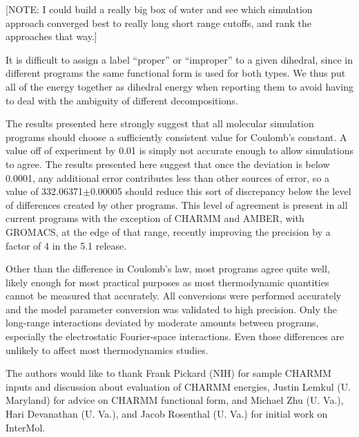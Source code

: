 [NOTE: I could build a really big box of water and see which
  simulation approach converged best to really long short range
  cutoffs, and rank the approaches that way.]

It is difficult to assign a label ``proper'' or ``improper'' to a
given dihedral, since in different programs the same functional form
is used for both types. We thus put all of the energy together as
dihedral energy when reporting them to avoid having to deal with the
ambiguity of different decompositions.

The results presented here strongly suggest that all molecular
simulation programs should choose a sufficiently consistent value for
Coulomb's constant. A value off of experiment by 0.01 is simply not
accurate enough to allow simulations to agree.  The results presented
here suggest that once the deviation is below 0.0001, any additional
error contributes less than other sources of error, so a value of
332.06371$\pm$0.00005 should reduce this sort of discrepancy below the
level of differences created by other programs.  This level of
agreement is present in all current programs with the exception of
CHARMM and AMBER, with GROMACS, at the edge of that range, recently
improving the precision by a factor of 4 in the 5.1 release.

Other than the difference in Coulomb's law, most programs agree quite
well, likely enough for most practical purposes as most thermodynamic
quantities cannot be measured that accurately.  All conversions were
performed accurately and the model parameter conversion was validated
to high precision. Only the long-range interactions deviated by
moderate amounts between programs, especially the electrostatic
Fourier-space interactions.  Even those differences are unlikely to
affect most thermodynamics studies.


\begin{acknowledgements}
The authors would like to thank Frank Pickard (NIH) for sample CHARMM
inputs and discussion about evaluation of CHARMM energies, Justin
Lemkul (U. Maryland) for advice on CHARMM functional form, and Michael
Zhu (U. Va.), Hari Devanathan (U. Va.), and Jacob Rosenthal (U. Va.)
for initial work on InterMol.
\end{acknowledgements}



